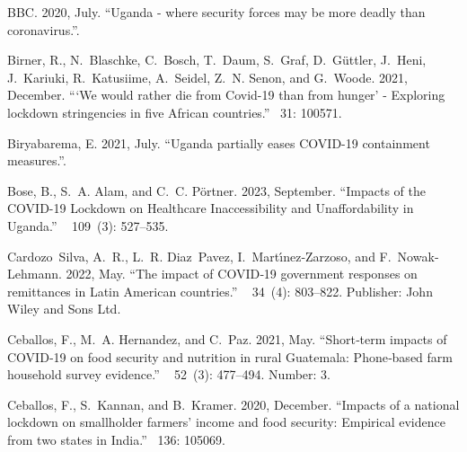 \documentclass{wber}
\begin{document}
\begin{thebibliography}{}
BBC. 2020, July.
\newblock ``Uganda - where security forces may be more deadly than
  coronavirus.''.

Birner, R., N.~Blaschke, C.~Bosch, T.~Daum, S.~Graf, D.~G{\"u}ttler, J.~Heni,
  J.~Kariuki, R.~Katusiime, A.~Seidel, Z.~N. Senon, and G.~Woode. 2021,
  December.
\newblock ```{We} would rather die from {Covid}-19 than from hunger' -
  {Exploring} lockdown stringencies in five {African} countries.''
~{31}: 100571.

Biryabarema, E. 2021, July.
\newblock ``Uganda partially eases {COVID}-19 containment measures.''.

Bose, B., S.~A. Alam, and C.~C. P{\"o}rtner. 2023, September.
\newblock ``{Impacts of the COVID-19 Lockdown on Healthcare Inaccessibility and
  Unaffordability in Uganda}.''
~{
  109\/}~(3): 527--535.

Cardozo~Silva, A.~R., L.~R. Diaz~Pavez, I.~Mart{\'\i}nez‐Zarzoso, and
  F.~Nowak‐Lehmann. 2022, May.
\newblock ``The impact of {COVID}‐19 government responses on remittances in
  {Latin} {American} countries.''
~{ 34\/}~(4): 803--822.
\newblock Publisher: John Wiley and Sons Ltd.

Ceballos, F., M.~A. Hernandez, and C.~Paz. 2021, May.
\newblock ``Short‐term impacts of {COVID}‐19 on food security and nutrition
  in rural {Guatemala}: {Phone}‐based farm household survey evidence.''
~{ 52\/}~(3): 477--494.
\newblock Number: 3.

Ceballos, F., S.~Kannan, and B.~Kramer. 2020, December.
\newblock ``Impacts of a national lockdown on smallholder farmers' income and
  food security: {Empirical} evidence from two states in {India}.''
~{136}: 105069.


\end{thebibliography}
\end{document}
